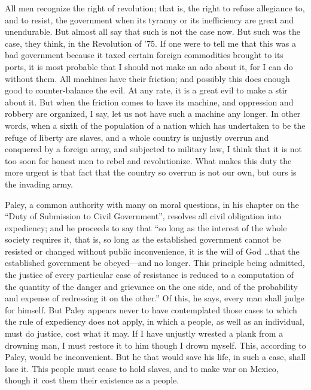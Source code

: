 \documentclass[letterpaper,12pt]{article}
\begin{document}
All men recognize the right of revolution; that is, the right to refuse
allegiance to, and to resist, the government when its tyranny or its
inefficiency are great and unendurable. But almost all say that such is not the
case now. But such was the case, they think, in the Revolution of '75. If one
were to tell me that this was a bad government because it taxed certain foreign
commodities brought to its ports, it is most probable that I should not make an
ado about it, for I can do without them. All machines have their friction; and
possibly this does enough good to counter-balance the evil. At any rate, it is
a great evil to make a stir about it. But when the friction comes to have its
machine, and oppression and robbery are organized, I say, let us not have such
a machine any longer. In other words, when a sixth of the population of a nation
which has undertaken to be the refuge of liberty are slaves, and a whole country
is unjustly overrun and conquered by a foreign army, and subjected to military
law, I think that it is not too soon for honest men to rebel and revolutionize.
What makes this duty the more urgent is that fact that the country so overrun is
not our own, but ours is the invading army.

Paley, a common authority with many on moral questions, in his chapter on the
\enquote{Duty of Submission to Civil Government}, resolves all civil obligation
into expediency; and he proceeds to say that \enquote{so long as the interest of
    the whole society requires it, that is, so long as the established
    government cannot be resisted or changed without public inconvenience, it is
    the will of God \dots that the established government be obeyed---and no
    longer. This principle being admitted, the justice of every particular case
    of resistance is reduced to a computation of the quantity of the danger and
    grievance on the one side, and of the probability and expense of redressing
    it on the other.} Of this, he says, every man shall judge for himself. But
Paley appears never to have contemplated those cases to which the rule of
expediency does not apply, in which a people, as well as an individual, must do
justice, cost what it may. If I have unjustly wrested a plank from a drowning
man, I must restore it to him though I drown myself. This, according to Paley,
would be inconvenient. But he that would save his life, in such a case, shall
lose it. This people must cease to hold slaves, and to make war on Mexico,
though it cost them their existence as a people.
\end{document}
